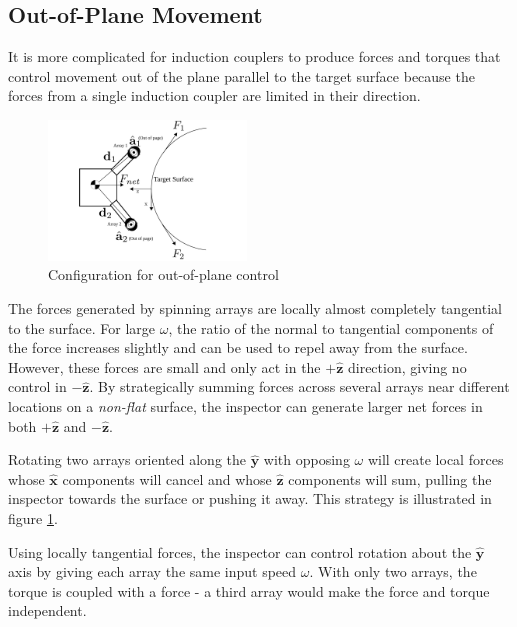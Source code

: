 \documentclass[letterpaper, 10 pt, conference]{ieeeconf}  %
\begin{document}
 


\subsection{Out-of-Plane Movement}\label{sec:oop_movement_desc}

It is more complicated for induction couplers to produce forces and torques that control movement out of the plane parallel to the target surface because the forces from a single induction coupler are limited in their direction. 

  \begin{figure}[thpb]
      \centering
      \includegraphics[width = 0.47\textwidth]{figures/curve_locomotion.pdf}
      \caption{Configuration for out-of-plane control}
      \label{fig:oopsetup}
   \end{figure}
   
\par The forces generated by spinning arrays are locally almost completely tangential to the surface. For large $\omega$, the ratio of the normal to tangential components of the force increases slightly and can be used to repel away from the surface. However, these forces are small and only act in the $+\hat{\textbf{z}}$ direction, giving no control in $-\hat{\textbf{z}}$. By strategically summing forces across several arrays near different locations on a \textit{non-flat} surface, the inspector can generate larger net forces in both $+\hat{\textbf{z}}$ and $-\hat{\textbf{z}}$. 

\par Rotating two arrays oriented along the $\hat{\textbf{y}}$ with opposing $\omega$ will create local forces whose $\hat{\textbf{x}}$ components will cancel and whose $\hat{\textbf{z}}$ components will sum, pulling the inspector towards the surface or pushing it away. This strategy is illustrated in figure \ref{fig:oopsetup}.     
\par Using locally tangential forces, the inspector can control rotation about the $\hat{\textbf{y}}$ axis by giving each array the same input speed $\omega$. With only two arrays, the torque is coupled with a force - a third array would make the force and torque independent. 
   
\end{document}
